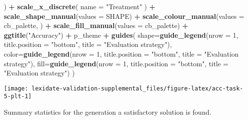 \documentclass[
]{book}
\newenvironment{Shaded}{\begin{snugshade}}{\end{snugshade}}
\newcommand{\AttributeTok}[1]{\textcolor[rgb]{0.13,0.29,0.53}{#1}}
\newcommand{\DecValTok}[1]{\textcolor[rgb]{0.00,0.00,0.81}{#1}}
\newcommand{\FunctionTok}[1]{\textcolor[rgb]{0.13,0.29,0.53}{\textbf{#1}}}
\newcommand{\NormalTok}[1]{#1}
\newcommand{\SpecialCharTok}[1]{\textcolor[rgb]{0.81,0.36,0.00}{\textbf{#1}}}
\newcommand{\StringTok}[1]{\textcolor[rgb]{0.31,0.60,0.02}{#1}}
\begin{document}
\begin{Shaded}
\begin{Highlighting}[]
\NormalTok{  ) }\SpecialCharTok{+}
  \FunctionTok{scale\_x\_discrete}\NormalTok{(}
    \AttributeTok{name =} \StringTok{"Treatment"}
\NormalTok{  ) }\SpecialCharTok{+}
  \FunctionTok{scale\_shape\_manual}\NormalTok{(}\AttributeTok{values =}\NormalTok{ SHAPE) }\SpecialCharTok{+}
  \FunctionTok{scale\_colour\_manual}\NormalTok{(}\AttributeTok{values =}\NormalTok{ cb\_palette, ) }\SpecialCharTok{+}
  \FunctionTok{scale\_fill\_manual}\NormalTok{(}\AttributeTok{values =}\NormalTok{ cb\_palette) }\SpecialCharTok{+}
  \FunctionTok{ggtitle}\NormalTok{(}\StringTok{"Accuracy"}\NormalTok{) }\SpecialCharTok{+}
\NormalTok{  p\_theme }\SpecialCharTok{+}
  \FunctionTok{guides}\NormalTok{(}
    \AttributeTok{shape=}\FunctionTok{guide\_legend}\NormalTok{(}\AttributeTok{nrow =} \DecValTok{1}\NormalTok{, }\AttributeTok{title.position =} \StringTok{"bottom"}\NormalTok{,}
                       \AttributeTok{title =} \StringTok{"Evaluation strategy"}\NormalTok{),}
    \AttributeTok{color=}\FunctionTok{guide\_legend}\NormalTok{(}\AttributeTok{nrow =} \DecValTok{1}\NormalTok{, }\AttributeTok{title.position =} \StringTok{"bottom"}\NormalTok{,}
                       \AttributeTok{title =} \StringTok{"Evaluation strategy"}\NormalTok{),}
    \AttributeTok{fill=}\FunctionTok{guide\_legend}\NormalTok{(}\AttributeTok{nrow =} \DecValTok{1}\NormalTok{, }\AttributeTok{title.position =} \StringTok{"bottom"}\NormalTok{,}
                      \AttributeTok{title =} \StringTok{"Evaluation strategy"}\NormalTok{)}
\NormalTok{  )}
\end{Highlighting}
\end{Shaded}

\texttt{[image: lexidate-validation-supplemental\_files/figure-latex/acc-task-5-plt-1]}

Summary statistics for the generation a satisfactory solution is found.
\end{document}
